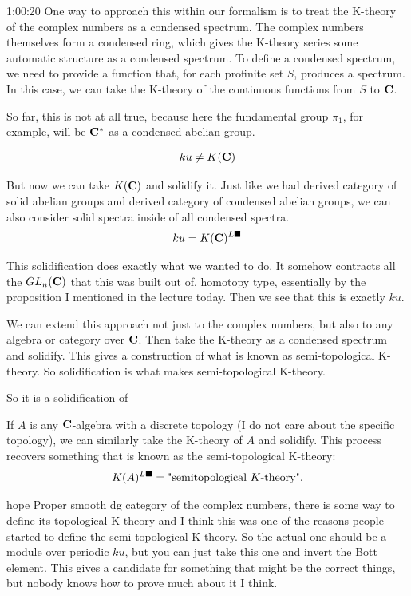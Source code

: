 \begin{unfinished}{1:00:20}
One way to approach this within our formalism is to treat the K-theory of the complex numbers as a condensed spectrum. The complex numbers themselves form a condensed ring, which gives the K-theory series some automatic structure as a condensed spectrum. To define a condensed spectrum, we need to provide a function that, for each profinite set $S$, produces a spectrum. In this case, we can take the K-theory of the continuous functions from $S$ to $\mathbf C$.

So far, this is not at all true, because here the fundamental group $\pi_1$, for example, will be $\mathbf C^*$ as a condensed abelian group.

\begin{align*}
ku \neq K(\mathbf C)
\end{align*}

But now we can take $K(\mathbf C)$ and solidify it. Just like we had derived category of solid abelian groups and derived category of condensed abelian groups, we can also consider solid spectra inside of all condensed spectra.
\begin{align*}
ku = K(\mathbf C)^{L\blacksquare}
\end{align*}

This solidification does exactly what we wanted to do. It somehow contracts all the $GL_n(\mathbf C)$ that this was built out of, homotopy type, essentially by the proposition I mentioned in the lecture today. Then we see that this is exactly $ku$. 


We can extend this approach not just to the complex numbers, but also to any algebra or category over $\mathbf C$. Then take the K-theory as a condensed spectrum and solidify. This gives a construction of what is known as semi-topological K-theory. So solidification is what makes semi-topological K-theory.

\ques So it is a solidification of 

\ans If $A$ is any $\mathbf C$-algebra with a discrete topology (I do not care about the specific topology), we can similarly take the K-theory of $A$ and solidify. This process recovers something that is known as the semi-topological K-theory:
\begin{align*}
K(A)^{L\blacksquare} = \text{"semitopological $K$-theory"}.
\end{align*}

hope Proper smooth dg category of the complex numbers, there is some way to define its topological K-theory and I think this was one of the reasons people started to define the semi-topological K-theory. So the actual one should be a module over periodic $ku$, but you can just take this one and invert the Bott element. This gives a candidate for something that might be the correct things, but nobody knows how to prove much about it I think.


\end{unfinished}
